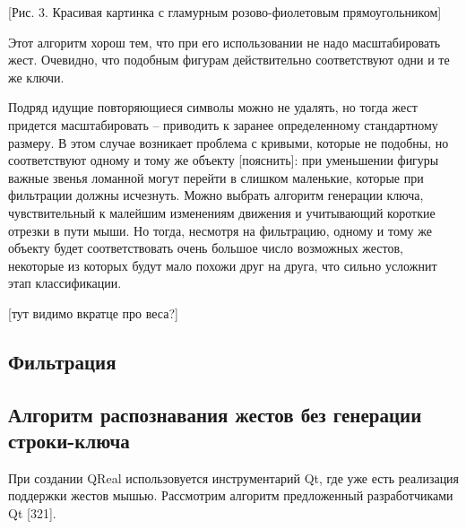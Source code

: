 \documentclass[a5paper]{article}
\begin{document}
[Рис. 3. Красивая картинка с гламурным розово-фиолетовым прямоугольником]

Этот алгоритм хорош тем, что при его использовании не надо масштабировать жест. Очевидно, что подобным фигурам действительно соответствуют 
одни и те же ключи.

Подряд идущие повторяющиеся символы можно не удалять, но тогда жест придется масштабировать -- приводить к 
заранее определенному стандартному размеру. В этом случае возникает проблема с кривыми, которые не подобны, но соответствуют одному и 
тому же объекту [пояснить]: при уменьшении фигуры важные звенья ломанной могут перейти в слишком маленькие, которые при фильтрации должны исчезнуть.
Можно выбрать алгоритм генерации ключа, чувствительный к малейшим изменениям движения и учитывающий короткие отрезки в пути мыши. Но
тогда, несмотря на фильтрацию, одному и тому же объекту будет соответствовать очень большое число возможных жестов, некоторые из
которых будут мало похожи друг на друга, что сильно усложнит этап классификации.

[тут видимо вкратце про веса?]

\subsection{Фильтрация}

\subsection{Алгоритм распознавания жестов без генерации строки-ключа}

При создании QReal использовуется инструментарий Qt, где уже есть реализация поддержки жестов мышью. Рассмотрим алгоритм предложенный 
разработчиками Qt [321].
\end{document}
